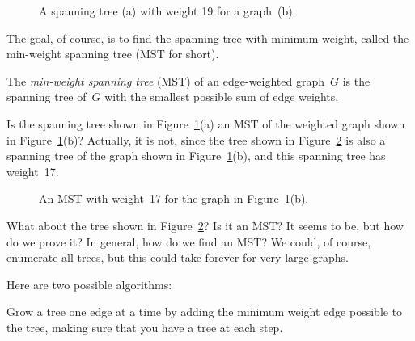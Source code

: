 \begin{figure}

%
\qquad
%

\caption{A spanning tree (a) with weight 19 for a graph~(b).}

\label{fig:5KA}

\end{figure}

The goal, of course, is to find the spanning tree with minimum weight,
called the min-weight spanning tree (MST for short).

\begin{definition}
The \emph{min-weight spanning tree} \textup(MST\textup) of an
edge-weighted graph~$G$ is the spanning tree of~$G$ with the smallest
possible sum of edge weights.
\end{definition}

Is the spanning tree shown in Figure~\ref{fig:5KA}(a) an MST of the
weighted graph shown in Figure~\ref{fig:5KA}(b)?  Actually, it is not,
since the tree shown in Figure~\ref{fig:5KB} is also a spanning tree
of the graph shown in Figure~\ref{fig:5KA}(b), and this spanning tree
has weight~17.

\begin{figure}


\caption{An MST with weight~17 for the graph in
  Figure~\ref{fig:5KA}(b).}
\label{fig:5KB}

\end{figure}

What about the tree shown in Figure~\ref{fig:5KB}?  Is it an MST?  It
seems to be, but how do we prove it?  In general, how do we find an
MST\@?  We could, of course, enumerate all trees, but this could take
forever for very large graphs.

Here are two possible algorithms:

\begin{editingnotes}
\end{editingnotes}

\begin{algorithm}\label{alg:MST1}
  Grow a tree one edge at a time by adding the minimum weight edge
  possible to the tree, making sure that you have a tree at each
  step.
\end{algorithm}

